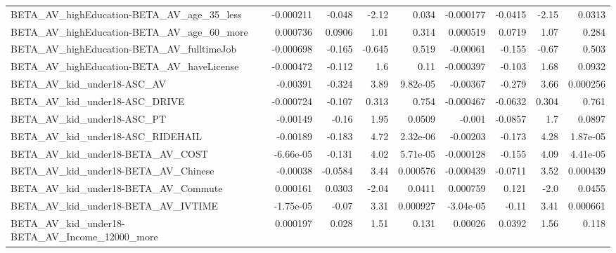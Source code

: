 \begin{tabular}{lrrrrrrrr}
BETA\_AV\_highEducation-BETA\_AV\_age\_35\_less          &   -0.000211 &       -0.048 &     -2.12 &    0.034 &  -0.000177 &     -0.0415 &        -2.15 &        0.0313 \\
BETA\_AV\_highEducation-BETA\_AV\_age\_60\_more          &    0.000736 &       0.0906 &      1.01 &    0.314 &   0.000519 &      0.0719 &         1.07 &         0.284 \\
BETA\_AV\_highEducation-BETA\_AV\_fulltimeJob          &   -0.000698 &       -0.165 &    -0.645 &    0.519 &   -0.00061 &      -0.155 &        -0.67 &         0.503 \\
BETA\_AV\_highEducation-BETA\_AV\_haveLicense          &   -0.000472 &       -0.112 &       1.6 &     0.11 &  -0.000397 &      -0.103 &         1.68 &        0.0932 \\
BETA\_AV\_kid\_under18-ASC\_AV                         &    -0.00391 &       -0.324 &      3.89 & 9.82e-05 &   -0.00367 &      -0.279 &         3.66 &      0.000256 \\
BETA\_AV\_kid\_under18-ASC\_DRIVE                      &   -0.000724 &       -0.107 &     0.313 &    0.754 &  -0.000467 &     -0.0632 &        0.304 &         0.761 \\
BETA\_AV\_kid\_under18-ASC\_PT                         &    -0.00149 &        -0.16 &      1.95 &   0.0509 &     -0.001 &     -0.0857 &          1.7 &        0.0897 \\
BETA\_AV\_kid\_under18-ASC\_RIDEHAIL                   &    -0.00189 &       -0.183 &      4.72 & 2.32e-06 &   -0.00203 &      -0.173 &         4.28 &      1.87e-05 \\
BETA\_AV\_kid\_under18-BETA\_AV\_COST                   &   -6.66e-05 &       -0.131 &      4.02 & 5.71e-05 &  -0.000128 &      -0.155 &         4.09 &      4.41e-05 \\
BETA\_AV\_kid\_under18-BETA\_AV\_Chinese                &    -0.00038 &      -0.0584 &      3.44 & 0.000576 &  -0.000439 &     -0.0711 &         3.52 &      0.000439 \\
BETA\_AV\_kid\_under18-BETA\_AV\_Commute                &    0.000161 &       0.0303 &     -2.04 &   0.0411 &   0.000759 &       0.121 &         -2.0 &        0.0455 \\
BETA\_AV\_kid\_under18-BETA\_AV\_IVTIME                 &   -1.75e-05 &        -0.07 &      3.31 & 0.000927 &  -3.04e-05 &       -0.11 &         3.41 &      0.000661 \\
BETA\_AV\_kid\_under18-BETA\_AV\_Income\_12000\_more      &    0.000197 &        0.028 &      1.51 &    0.131 &    0.00026 &      0.0392 &         1.56 &         0.118 \\

\end{tabular}

